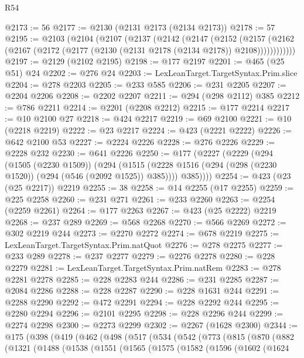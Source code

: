 \begin{lexlean}{R54}
\begin{coremodule}
@2173 := 56
@2177 := @2130 (@2131 @2173 (@2134 @2173))
@2178 := 57
@2195 := @2103
    (@2104
      (@2107
        (@2137
          (@2142
            (@2147
              (@2152
                (@2157
                  (@2162 (@2167 (@2172 (@2177 (@2130 (@2131 @2178 (@2134 @2178)) @2108))))))))))))
@2197 := @2129 (@2102 @2195)
@2198 := @177 @2197
@2201 := @465 (@25 @51) @24
@2202 := @276 @24
@2203 := LexLeanTarget.TargetSyntax.Prim.slice
@2204 := @278 @2203
@2205 := @233 @585
@2206 := @231 @2205
@2207 := @2204 @2206
@2208 := @2202 @2207
@2211 := @294 (@298 @2112) @385
@2212 := @786 @2211
@2214 := @2201 (@2208 @2212)
@2215 := @177 @2214
@2217 := @10 @2100 @27
@2218 := @424 @2217
@2219 := @69 @2100
@2221 := @10 (@2218 @2219)
@2222 := @23 @2217
@2224 := @423 (@2221 @2222)
@2226 := @642 @2100 @53
@2227 := @2224 @2226
@2228 := @276 @2226
@2229 := @2228 @232
@2230 := @641 @2226
@2250 := @177
    (@2227
      (@2229
        (@294
          (@1505 (@2230 @1509))
          (@294
            (@1515 (@2228 @1516 (@294 (@298 (@2230 @1520)) (@294 (@546 (@2092 @1525)) @385))))
            @385))))
@2254 := @423 (@23 (@25 @2217)) @2219
@2255 := 38
@2258 := @14 @2255 (@17 @2255)
@2259 := @225 @2258
@2260 := @231 @271
@2261 := @233 @2260
@2263 := @2254 (@2259 @2261)
@2264 := @177 @2263
@2267 := @423 (@25 @2222) @2219
@2268 := @237 @289
@2269 := @568 @2268
@2270 := @566 @2269
@2272 := @302 @2219 @244
@2273 := @2270 @2272
@2274 := @678 @2219
@2275 := LexLeanTarget.TargetSyntax.Prim.natQuot
@2276 := @278 @2275
@2277 := @233 @289
@2278 := @237 @2277
@2279 := @2276 @2278
@2280 := @228 @2279
@2281 := LexLeanTarget.TargetSyntax.Prim.natRem
@2283 := @278 @2281 @2278
@2285 := @228 @2283 @244
@2286 := @231 @2285
@2287 := @2084 @2286
@2288 := @228 @2287
@2290 := @228 @1631 @244
@2291 := @2288 @2290
@2292 := @472 @2291
@2294 := @228 @2292 @244
@2295 := @2280 @2294
@2296 := @2101 @2295
@2298 := @228 @2296 @244
@2299 := @2274 @2298
@2300 := @2273 @2299
@2302 := @2267 (@1628 @2300)
@2344 := @175
    (@398
      (@419
        (@462
          (@498
            (@517
              (@534
                (@542
                  (@773
                    (@815
                      (@870
                        (@882
                          (@1321
                            (@1488
                              (@1538
                                (@1551
                                  (@1565
                                    (@1575
                                      (@1582
                                        (@1596
                                          (@1602
                                            (@1624

\end{coremodule}
\end{lexlean}
